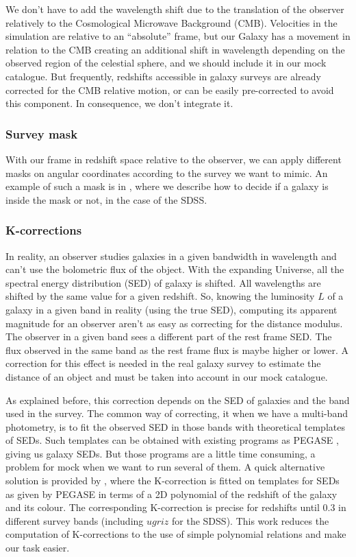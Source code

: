 We don't have to add the wavelength shift due to the translation of the
observer relatively to the Cosmological Microwave Background (CMB). Velocities
in the simulation are relative to an ``absolute'' frame, but our Galaxy has a
movement in relation to the CMB creating an additional shift in wavelength
depending on the observed region of the celestial sphere, and we should include
it in our mock catalogue. But frequently, redshifts accessible in galaxy
surveys are already corrected for the CMB relative motion, or can be easily
pre-corrected to avoid this component. In consequence, we don't integrate it.

\subsubsection{Survey mask}

With our frame in redshift space relative to the observer, we can apply
different masks on angular coordinates according to the survey we want to
mimic. An example of such a mask is in , where we describe
how to decide if a galaxy is inside the mask or not, in the case of the SDSS\@.

\subsubsection{K-corrections}

In reality, an observer studies galaxies in a given bandwidth in wavelength and
can't use the bolometric flux of the object. With the expanding Universe, all
the spectral energy distribution (SED) of galaxy is shifted. All wavelengths
are shifted by the same value for a given redshift. So, knowing the luminosity
$L$ of a galaxy in a given band in reality (using the true SED), computing its
apparent magnitude for an observer aren't as easy as correcting for the
distance modulus. The observer in a given band sees a different part of the
rest frame SED\@. The flux observed in the same band as the rest frame flux is
maybe higher or lower. A correction for this effect is needed in the real
galaxy survey to estimate the distance of an object and must be taken into
account in our mock catalogue.

As explained before, this correction depends on the SED of galaxies and the
band used in the survey. The common way of correcting, it when we have a
multi-band photometry, is to fit the observed SED in those bands with
theoretical templates of SEDs. Such templates can be obtained with existing
programs as PEGASE \citep{LeBorgne+04}, giving us galaxy SEDs. But those
programs are a little time consuming, a problem for mock when we want to run
several of them. A quick alternative solution is provided by
\citet{Chilingarian+10}, where the K-correction is fitted on templates for SEDs
as given by PEGASE in terms of a 2D polynomial of the redshift of the galaxy
and its colour. The corresponding K-correction is precise for redshifts until
0.3 in different survey bands (including $ugriz$ for the SDSS). This work
reduces the computation of K-corrections to the use of simple polynomial
relations and make our task easier.

